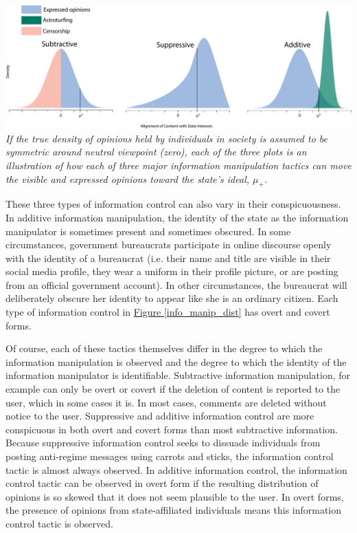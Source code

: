 \documentclass[11pt]{article}
\begin{document}
\begin{minipage}{\linewidth}
    \begin{center}
      \singlespacing
      \includegraphics[width=\textwidth]{figures/info_manip_dist.pdf}\\
      \scriptsize{\it If the true density of opinions held by individuals in society is assumed to be symmetric around neutral viewpoint (zero), each of the three plots is an illustration of how each of three major information manipulation tactics can move the visible and expressed opinions toward the state's ideal, $\mu_{+}$.}\vspace{2em}
      \label{info_manip_dist}
    \end{center}
\end{minipage}

These three types of information control can also vary in their conspicuousness. In additive information manipulation, the identity of the state as the information manipulator is sometimes present and sometimes obscured. In some circumstances, government bureaucrats participate in online discourse openly with the identity of a bureaucrat (i.e. their name and title are visible in their social media profile, they wear a uniform in their profile picture, or are posting from an official government account). In other circumstances, the bureaucrat will deliberately obscure her identity to appear like she is an ordinary citizen. Each type of information control in \hyperref[info_manip_dist]{Figure \ref*{info_manip_dist}} has overt and covert forms.

Of course, each of these tactics themselves differ in the degree to which the information manipulation is observed and the degree to which the identity of the information manipulator is identifiable. Subtractive information manipulation, for example can only be overt or covert if the deletion of content is reported to the user, which in some cases it is. In most cases, comments are deleted without notice to the user. Suppressive and additive information control are more conspicuous in both overt and covert forms than most subtractive information. Because suppressive information control seeks to dissuade individuals from posting anti-regime messages using carrots and sticks, the information control tactic is almost always observed. In additive information control, the information control tactic can be observed in overt form if the resulting distribution of opinions is so skewed that it does not seem plausible to the user. In overt forms, the presence of opinions from state-affiliated individuals means this information control tactic is observed.
\end{document}
